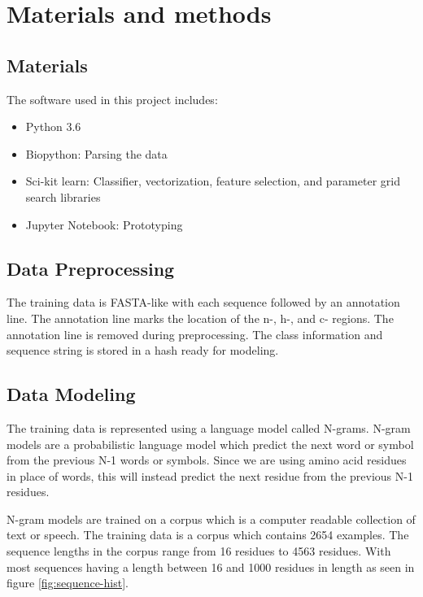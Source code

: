 \documentclass[10pt,letterpaper]{article}
\begin{document}
	\section*{Materials and methods}
	\subsection*{Materials}
	The software used in this project includes:
	\begin{itemize}
		\item{Python 3.6}
		\item{Biopython: Parsing the data}
		\item{Sci-kit learn: Classifier, vectorization, feature selection, and parameter grid search libraries}
		\item{Jupyter Notebook: Prototyping}
	\end{itemize}
	\subsection*{Data Preprocessing}
	The training data is FASTA-like with each sequence followed by an annotation line.  The annotation line marks the location of the n-, h-, and c- regions. The annotation line is removed during preprocessing. The class information and sequence string is stored in a hash ready for modeling.
	
	\subsection*{Data Modeling}
	The training data is represented using a language model called N-grams. N-gram models are a probabilistic language model which predict the next word or symbol from the previous N-1 words or symbols. Since we are using amino acid residues in place of words, this will instead predict the next residue from the previous N-1 residues. 

	N-gram models are trained on a corpus which is a computer readable collection of text or speech\cite{jurafsky}. The training data is a corpus which contains 2654 examples. The sequence lengths in the corpus range from 16 residues to 4563 residues. With most sequences having a length between 16 and 1000 residues in length as seen in figure \ref{fig:sequence-hist}. 
	
\end{document}
